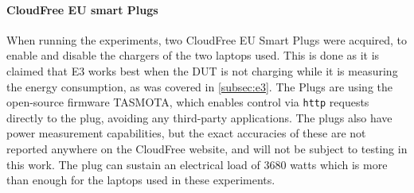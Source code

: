 \paragraph*{CloudFree EU smart Plugs}

When running the experiments, two CloudFree EU Smart Plugs\cite{CloudFreeEUSMartPlug} were acquired, to enable and disable the chargers of the two laptops used. This is done as it is claimed that E3  works best when the DUT is not charging while it is measuring the energy consumption, as was covered in \cref{subsec:e3}. The Plugs are using the open-source firmware TASMOTA\cite{TomatoGit}, which enables control via \texttt{http} requests directly to the plug, avoiding any third-party applications. The plugs also have power measurement capabilities, but the exact accuracies of these are not reported anywhere on the CloudFree website, and will not be subject to testing in this work. The plug can sustain an electrical load of 3680 watts which is more than enough for the laptops used in these experiments.\cite{CloudFreeEUSMartPlug}